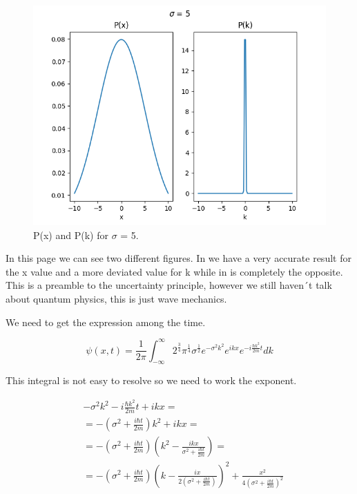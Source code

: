 \begin{figure}[H]
    \centering
    \includegraphics{images2/P_x&P_k_sigma=5.png}
    \caption{P(x) and P(k) for $\sigma$ = 5.}
\end{figure}

In this page we can see two different figures. In  we have a very accurate result for the x value and a more deviated value for k while in  is completely the opposite. This is a preamble to the uncertainty principle, however we still haven´t talk about quantum physics, this is just wave mechanics.


We need to get the expression among the time.

\begin{equation}
    \label{2.32}
    \psi(x,t) = \frac{1}{2\pi}\int_{-\infty}^{\infty} 2^\frac{3}{4} \pi^\frac{1}{4} \sigma^\frac{1}{2} e^{-\sigma^2 k^2} e^{ikx} e^{-i\frac{\hbar k^2}{2m}t} dk
\end{equation} 

This integral is not easy to resolve so we need to work the exponent.

\begin{equation}
    \label{2.33}
    \begin{split}
        & - \sigma^2 k^2 - i \frac{\hbar k^2}{2m} t + ikx = \\
        & = - (\sigma^2 + \frac{i\hbar t}{2m})k^2 + ikx = \\
        & = - (\sigma^2 + \frac{i\hbar t}{2m}) (k^2 - \frac{ikx}{\sigma^2 + \frac{i\hbar t}{2m}}) = \\
        & = - (\sigma^2 + \frac{i\hbar t}{2m}) (k-\frac{ix}{2(\sigma^2 + \frac{i\hbar t}{2m})})^2 + \frac{x^2}{4(\sigma^2 + \frac{i\hbar t}{2m})^2}
    \end{split}
\end{equation}

